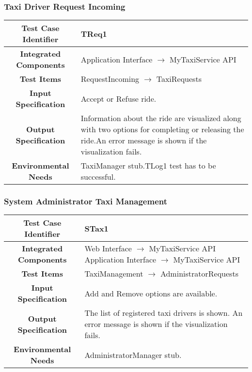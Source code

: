 \documentclass[11pt, a4paper,titlepage]{article}
\begin{document}
	\subsubsection{Taxi Driver Request Incoming}
	\begin{tabularx}{\textwidth}{| c|X|}
		\hline \textbf{Test Case Identifier} & \label{TReq1}TReq1 \\
		\hline \textbf{Integrated Components} & Application Interface $\rightarrow $ MyTaxiService API \\
		\hline \textbf{Test Items} & RequestIncoming $\rightarrow $ TaxiRequests \\
		\hline \textbf{Input Specification} & Accept or Refuse ride. \\
		\hline \textbf{Output Specification} & Information about the ride are visualized along with two options for completing or releasing the ride.\newline An error message is shown if the visualization fails. \\
		\hline \textbf{Environmental Needs} & TaxiManager stub.\newline TLog1  test has to be successful. \\
		\hline
	\end{tabularx}
	\newline
	\newline
	\subsubsection{System Administrator Taxi Management}
	\begin{tabularx}{\textwidth}{| c|X|}
		\hline \textbf{Test Case Identifier} & \label{STax1}STax1 \\
		\hline \textbf{Integrated Components} & Web Interface $\rightarrow $ MyTaxiService API \newline 
		Application Interface $\rightarrow $ MyTaxiService API \\
		\hline \textbf{Test Items} & TaxiManagement $\rightarrow $ AdministratorRequests \\
		\hline \textbf{Input Specification} & Add and Remove options are available. \\
		\hline \textbf{Output Specification} & The list of registered taxi drivers is shown.\newline
		An error message is shown if the visualization fails. \\
		\hline \textbf{Environmental Needs} & AdministratorManager stub. \\
		\hline
	\end{tabularx}
	\newline
	\newline
\end{document}
